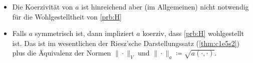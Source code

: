 \documentclass[../skript.tex]{subfiles}
\begin{document}
\begin{remark}
	\begin{itemize}
		\item Die Koerzivität von $a$ ist hinreichend aber (im Allgemeinen) nicht notwendig für die Wohlgestelltheit von \cref{prb:H}
		\item Falls $a$ symmetrisch ist, dann impliziert $a$ koerziv, dass \cref{prb:H} wohlgestellt ist.
			Das ist im wesentlichen der Riesz'sche Darstellungssatz (\cref{thm:c1e5s2}) plus die Äquivalenz der Normen $\|\cdot\|_V$ und $\|\cdot\|_a \coloneqq \sqrt{a(\cdot,\cdot)}$.
	\end{itemize}
\end{remark}
\end{document}
